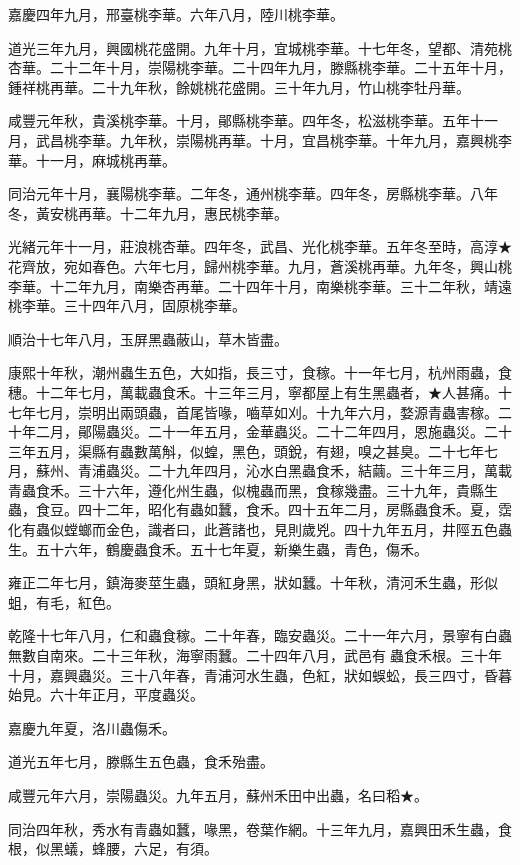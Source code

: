 \begin{pinyinscope}
嘉慶四年九月，邢臺桃李華。六年八月，陸川桃李華。

道光三年九月，興國桃花盛開。九年十月，宜城桃李華。十七年冬，望都、清苑桃杏華。二十二年十月，崇陽桃李華。二十四年九月，滕縣桃李華。二十五年十月，鍾祥桃再華。二十九年秋，餘姚桃花盛開。三十年九月，竹山桃李牡丹華。

咸豐元年秋，貴溪桃李華。十月，鄖縣桃李華。四年冬，松滋桃李華。五年十一月，武昌桃李華。九年秋，崇陽桃再華。十月，宜昌桃李華。十年九月，嘉興桃李華。十一月，麻城桃再華。

同治元年十月，襄陽桃李華。二年冬，通州桃李華。四年冬，房縣桃李華。八年冬，黃安桃再華。十二年九月，惠民桃李華。

光緒元年十一月，莊浪桃杏華。四年冬，武昌、光化桃李華。五年冬至時，高淳★花齊放，宛如春色。六年七月，歸州桃李華。九月，蒼溪桃再華。九年冬，興山桃李華。十二年九月，南樂杏再華。二十四年十月，南樂桃李華。三十二年秋，靖遠桃李華。三十四年八月，固原桃李華。

順治十七年八月，玉屏黑蟲蔽山，草木皆盡。

康熙十年秋，潮州蟲生五色，大如指，長三寸，食稼。十一年七月，杭州雨蟲，食穗。十二年七月，萬載蟲食禾。十三年三月，寧都屋上有生黑蟲者，★人甚痛。十七年七月，崇明出兩頭蟲，首尾皆喙，嚙草如刈。十九年六月，婺源青蟲害稼。二十年二月，鄖陽蟲災。二十一年五月，金華蟲災。二十二年四月，恩施蟲災。二十三年五月，渠縣有蟲數萬斛，似蝗，黑色，頭銳，有翅，嗅之甚臭。二十七年七月，蘇州、青浦蟲災。二十九年四月，沁水白黑蟲食禾，結繭。三十年三月，萬載青蟲食禾。三十六年，遵化州生蟲，似槐蟲而黑，食稼幾盡。三十九年，貴縣生蟲，食豆。四十二年，昭化有蟲如蠶，食禾。四十五年二月，房縣蟲食禾。夏，霑化有蟲似螳螂而金色，識者曰，此蒼諸也，見則歲兇。四十九年五月，井陘五色蟲生。五十六年，鶴慶蟲食禾。五十七年夏，新樂生蟲，青色，傷禾。

雍正二年七月，鎮海麥莖生蟲，頭紅身黑，狀如蠶。十年秋，清河禾生蟲，形似蛆，有毛，紅色。

乾隆十七年八月，仁和蟲食稼。二十年春，臨安蟲災。二十一年六月，景寧有白蟲無數自南來。二十三年秋，海寧雨蠶。二十四年八月，武邑有蟲食禾根。三十年十月，嘉興蟲災。三十八年春，青浦河水生蟲，色紅，狀如蜈蚣，長三四寸，昏暮始見。六十年正月，平度蟲災。

嘉慶九年夏，洛川蟲傷禾。

道光五年七月，滕縣生五色蟲，食禾殆盡。

咸豐元年六月，崇陽蟲災。九年五月，蘇州禾田中出蟲，名曰稻★。

同治四年秋，秀水有青蟲如蠶，喙黑，卷葉作網。十三年九月，嘉興田禾生蟲，食根，似黑蟻，蜂腰，六足，有須。


\end{pinyinscope}
